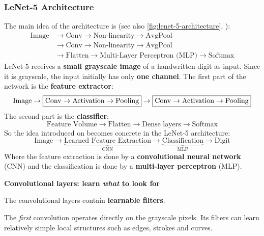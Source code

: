\subsubsection{LeNet-5 Architecture}\label{sec:lenet-5-architecture}

The main idea of the architecture is (see also \autoref{fig:lenet-5-architecture}, ):
\begin{align*}
    \text{Image} &\to \text{Conv} \to \text{Non-linearity} \to \text{AvgPool} \\
    &\to \text{Conv} \to \text{Non-linearity} \to \text{AvgPool} \\
    &\to \text{Flatten} \to \text{Multi-Layer Perceptron (MLP)} \to \text{Softmax}
\end{align*}
LeNet-5 receives a \textbf{small grayscale image} of a handwritten digit as input. Since it is grayscale, the input initially has only \textbf{one channel}. The first part of the network is the \textbf{feature extractor}:
\begin{equation*}
    \text{Image} \to \boxed{%
        \text{Conv} \to \text{Activation} \to \text{Pooling}
    }
    \to
    \boxed{%
        \text{Conv} \to \text{Activation} \to \text{Pooling}
    }
\end{equation*}
The second part is the \textbf{classifier}:
\begin{equation*}
    \text{Feature Volume} \to \text{Flatten} \to \boxed{\text{Dense layers}} \to \boxed{\text{Softmax}}
\end{equation*}
So the idea introduced on  becomes concrete in the LeNet-5 architecture:
\begin{equation*}
    \text{Image} \to \underbrace{\text{Learned Feature Extraction}}_{\text{CNN}} \to \underbrace{\text{Classification}}_{\text{MLP}} \to \text{Digit}
\end{equation*}
Where the feature extraction is done by a \textbf{convolutional neural network} (CNN) and the classification is done by a \textbf{multi-layer perceptron} (MLP).

\highspace
\begin{flushleft}
    \textcolor{Green3}{ \textbf{Convolutional layers: learn \emph{what} to look for}}
\end{flushleft}
The convolutional layers contain \textbf{learnable filters}.

\highspace
The \emph{first} convolution operates directly on the grayscale pixels. Its filters can learn relatively simple local structures such as edges, strokes and curves.

